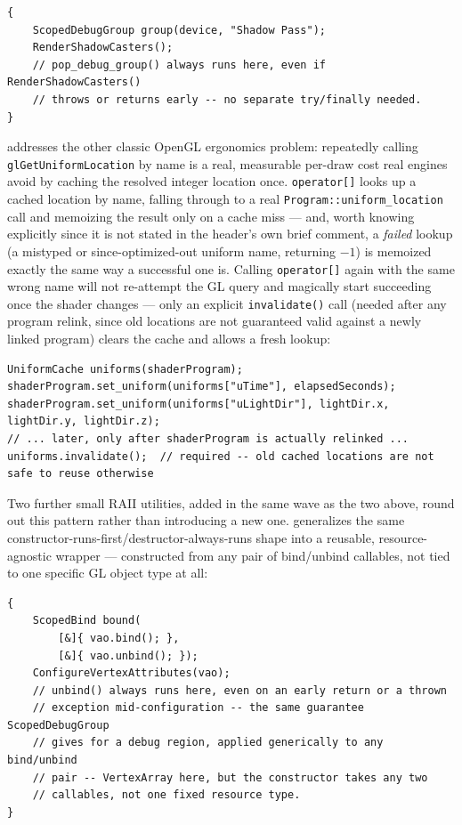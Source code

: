 \begin{lstlisting}
{
    ScopedDebugGroup group(device, "Shadow Pass");
    RenderShadowCasters();
    // pop_debug_group() always runs here, even if RenderShadowCasters()
    // throws or returns early -- no separate try/finally needed.
}
\end{lstlisting}

 addresses the other classic OpenGL ergonomics problem: repeatedly
calling \texttt{glGetUniformLocation} by name is a real, measurable per-draw cost real engines
avoid by caching the resolved integer location once. \texttt{operator[]} looks up a cached
location by name, falling through to a real \texttt{Program::uniform\_location} call and
memoizing the result only on a cache miss --- and, worth knowing explicitly since it is not
stated in the header's own brief comment, a \emph{failed} lookup (a mistyped or since-optimized-out
uniform name, returning $-1$) is memoized exactly the same way a successful one is. Calling
\texttt{operator[]} again with the same wrong name will not re-attempt the GL query and
magically start succeeding once the shader changes --- only an explicit \texttt{invalidate()}
call (needed after any program relink, since old locations are not guaranteed valid against a
newly linked program) clears the cache and allows a fresh lookup:

\begin{lstlisting}
UniformCache uniforms(shaderProgram);
shaderProgram.set_uniform(uniforms["uTime"], elapsedSeconds);
shaderProgram.set_uniform(uniforms["uLightDir"], lightDir.x, lightDir.y, lightDir.z);
// ... later, only after shaderProgram is actually relinked ...
uniforms.invalidate();  // required -- old cached locations are not safe to reuse otherwise
\end{lstlisting}

Two further small RAII utilities, added in the same wave as the two above, round out this
pattern rather than introducing a new one.  generalizes the same
constructor-runs-first/destructor-always-runs shape into a reusable, resource-agnostic
wrapper --- constructed from any pair of bind/unbind callables, not tied to one specific GL
object type at all:

\begin{lstlisting}
{
    ScopedBind bound(
        [&]{ vao.bind(); },
        [&]{ vao.unbind(); });
    ConfigureVertexAttributes(vao);
    // unbind() always runs here, even on an early return or a thrown
    // exception mid-configuration -- the same guarantee ScopedDebugGroup
    // gives for a debug region, applied generically to any bind/unbind
    // pair -- VertexArray here, but the constructor takes any two
    // callables, not one fixed resource type.
}
\end{lstlisting}

